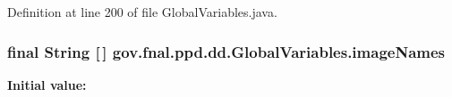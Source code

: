 Definition at line 200 of file Global\-Variables.\-java.

\hypertarget{classgov_1_1fnal_1_1ppd_1_1dd_1_1GlobalVariables_a356be5e37e706b201f6bc26130b73ce3}{
\subsubsection[{image\-Names}]{\setlength{\rightskip}{0pt plus 5cm}final String \mbox{[}$\,$\mbox{]} gov.\-fnal.\-ppd.\-dd.\-Global\-Variables.\-image\-Names\hspace{0.3cm}{\ttfamily [static]}}}\label{classgov_1_1fnal_1_1ppd_1_1dd_1_1GlobalVariables_a356be5e37e706b201f6bc26130b73ce3}
{\bfseries Initial value\-:}
